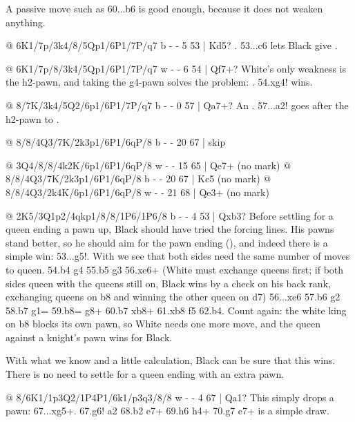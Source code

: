 A passive move such as 60...\Q b6 is good enough, because it does not weaken anything.

@ 6K1/7p/3k4/8/5Qp1/6P1/7P/q7 b - - 5 53 | Kd5?
. 53...\K c6 lets Black give .

@ 6K1/7p/8/3k4/5Qp1/6P1/7P/q7 w - - 6 54 | Qf7+?
White's only weakness is the h2-pawn, and taking the g4-pawn solves the problem:
. 54.\Q xg4! wins.

@ 8/7K/3k4/5Q2/6p1/6P1/7P/q7 b - - 0 57 | Qa7+?
An . 57...\Q a2! goes after the h2-pawn
to .

@ 8/8/4Q3/7K/2k3p1/6P1/6qP/8 b - - 20 67 | skip

@ 3Q4/8/8/4k2K/6p1/6P1/6qP/8 w - - 15 65 | Qe7+ (no mark)
@ 8/8/4Q3/7K/2k3p1/6P1/6qP/8 b - - 20 67 | Kc5 (no mark)
@ 8/8/4Q3/2k4K/6p1/6P1/6qP/8 w - - 21 68 | Qe3+ (no mark)

@ 2K5/3Q1p2/4qkp1/8/8/1P6/1P6/8 b - - 4 53 | Qxb3?
Before settling for a queen ending a pawn up, Black should have tried the forcing lines. His pawns
stand better, so he should aim for the pawn ending (), and indeed
there is a simple win: 53...g5!. With  we see that both
sides need the same number of moves to queen. 54.b4 g4 55.b5 g3 56.\Q xe6+ (White must exchange
queens first; if both sides queen with the queens still on, Black wins by a check on
his back rank, exchanging queens on b8 and winning the other queen on d7) 56...\K xe6
57.b6 g2 58.b7 g1=\Q{} 59.b8=\Q{} \Q g8+ 60.\K b7 \Q xb8+ 61.\K xb8 f5 62.b4. Count again: the white
king on b8 blocks its own pawn, so White needs one more move, and the queen against a knight's
pawn wins for Black.

With what we know and a little calculation, Black can be sure that this wins. There is no need to
settle for a queen ending with an extra pawn.

@ 8/6K1/1p3Q2/1P4P1/6k1/p3q3/8/8 w - - 4 67 | Qa1?
This simply drops a pawn: 67...\Q xg5+. 67.g6! a2 68.\Q b2 \Q e7+ 69.\K h6 \Q h4+ 70.\K g7 \Q e7+
is a simple draw.

